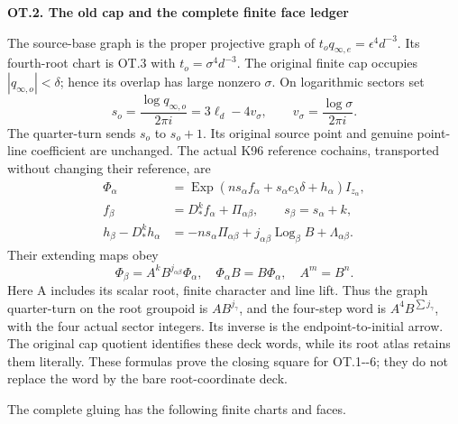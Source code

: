 \par

\medskip\noindent\textbf{OT.2. The old cap and the complete finite face ledger}

\par\nobreak

The source-base graph is the proper projective graph of
\(t_o q_{\infty,e}=\epsilon^4d^{-3}\). Its fourth-root chart is
OT.3 with \(t_o=\sigma^4d^{-3}\). The original finite cap occupies
\(|q_{\infty,o}|<\delta\); hence its overlap has large nonzero
\(\sigma\). On logarithmic sectors set
\[
s_o=\frac{\log q_{\infty,o}}{2\pi i}
       =3\ell_d-4v_\sigma,\qquad
v_\sigma=\frac{\log\sigma}{2\pi i}.
                                                               \tag{OT.7}
\]
The quarter-turn sends \(s_o\) to \(s_o+1\). Its original source
point and genuine point-line coefficient are unchanged. The actual
K96 reference cochains, transported without changing their reference,
are
\[
\begin{aligned}
\Phi_\alpha&=\operatorname{Exp}
 (ns_\alpha f_\alpha+s_\alpha c_\lambda\delta+h_\alpha)I_{z_\alpha},\\
f_\beta&=D_*^k f_\alpha+\Pi_{\alpha\beta},\qquad
s_\beta=s_\alpha+k,\\
h_\beta-D_*^k h_\alpha
 &=-ns_\alpha\Pi_{\alpha\beta}
       +j_{\alpha\beta}\operatorname{Log}_\beta B
       +\Lambda_{\alpha\beta}.
\end{aligned}                                                   \tag{OT.8}
\]
Their extending maps obey
\[
\Phi_\beta=A^kB^{j_{\alpha\beta}}\Phi_\alpha,
\quad \Phi_\alpha B=B\Phi_\alpha,
\quad A^m=B^n.                                             \tag{OT.9}
\]
Here A includes its scalar root, finite character and line lift.
Thus the graph quarter-turn on the root groupoid is
\(AB^{j_\gamma}\), and the four-step word is
\(A^4B^{\sum j_\gamma}\), with the four actual sector integers.
Its inverse is the endpoint-to-initial arrow. The original cap
quotient identifies these deck words, while its root atlas retains
them literally. These formulas prove the closing square for OT.1-\/-6;
they do not replace the word by the bare root-coordinate deck.

The complete gluing has the following finite charts and faces.

